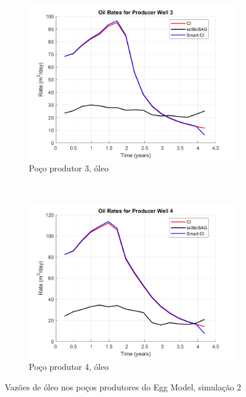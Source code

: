 \begin{figure}[!ht]
	\begin{subfigure}[b]{.3\textwidth}
		\includegraphics[width=\textwidth]{figs/resultadosEgg/imgsim2/EGG_OilWell3_Zoom}
		\caption{Po\c{c}o produtor 3, \'{o}leo}
		\label{EGG2_OilWell3}
	\end{subfigure}
	~
	\begin{subfigure}[b]{.3\textwidth}
		\includegraphics[width=\textwidth]{figs/resultadosEgg/imgsim2/EGG_OilWell4_Zoom}
		\caption{Po\c{c}o produtor 4, \'{o}leo}
		\label{EGG2_OilWell4}
	\end{subfigure}
	\caption{Vaz\~{o}es de \'{o}leo nos po\c{c}os produtores do Egg Model, simula\c{c}\~{a}o 2}
	\label{EGG2_OilRates}
\end{figure}

